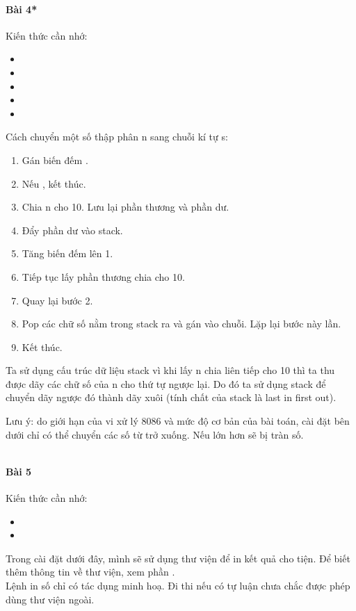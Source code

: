 \documentclass[main.tex]{subfiles}
\begin{document}
\paragraph*{Bài 4*}
Kiến thức cần nhớ:
\begin{itemize}
    \item {}
    \item {}
    \item {}
    \item {}
    \item {}
\end{itemize}
Cách chuyển một số thập phân \cd n sang chuỗi kí tự \cd s:
\begin{enumerate}
    \item Gán biến đếm .
    \item Nếu , kết thúc.
    \item Chia \cd n cho 10. Lưu lại phần thương và phần dư.
    \item Đẩy phần dư vào stack.
    \item Tăng biến đếm lên 1.
    \item Tiếp tục lấy phần thương chia cho 10.\bigskip
    \item Quay lại bước 2.
    \item Pop các chữ số nằm trong stack ra và gán vào chuỗi. Lặp lại bước này  lần.
    \item Kết thúc.
\end{enumerate}
Ta sử dụng cấu trúc dữ liệu stack vì khi lấy \cd n chia liên tiếp cho 10 thì ta thu được dãy các chữ số của \cd n cho thứ tự ngược lại. Do đó ta sử dụng stack để chuyển dãy ngược đó thành dãy xuôi (tính chất của stack là last in first out).\par 
Lưu ý: do giới hạn của vi xử lý 8086 và mức độ cơ bản của bài toán, cài đặt bên dưới chỉ có thể chuyển các số từ  trở xuống. Nếu lớn hơn sẽ bị tràn số.

\inputminted[linenos,breaklines]{nasm}{answer_source/Bai4.asm}
\paragraph*{Bài 5}
Kiến thức cần nhớ:
\begin{itemize}
    \item {}
    \item {}
\end{itemize}
Trong cài đặt dưới đây, mình sẽ sử dụng thư viện  để in kết quả cho tiện. Để biết thêm thông tin về thư viện, xem phần .\\
Lệnh in số chỉ có tác dụng minh hoạ. Đi thi nếu có tự luận chưa chắc được phép dùng thư viện ngoài.
\end{document}
